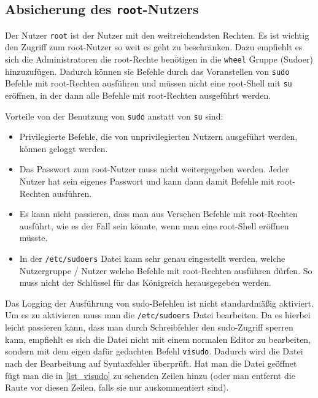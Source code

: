 \subsection{Absicherung des \texttt{root}-Nutzers}
Der Nutzer \texttt{root} ist der Nutzer mit den weitreichendsten Rechten. Es ist wichtig den Zugriff zum root-Nutzer so weit es geht zu beschränken. Dazu empfiehlt es sich die Administratoren die root-Rechte benötigen in die \texttt{wheel} Gruppe {\small(Sudoer)} hinzuzufügen. Dadurch können sie Befehle durch das Voranstellen von \texttt{sudo} Befehle mit root-Rechten ausführen und müssen nicht eine root-Shell mit \texttt{su} eröffnen, in der dann alle Befehle mit root-Rechten ausgeführt werden.\cite{GuideSecureConfiguration2011, SecurityArchWiki}

Vorteile von der Benutzung von \texttt{sudo} anstatt von \texttt{su} sind\cite{SecurityArchWiki}:
\begin{itemize}
  \item Privilegierte Befehle, die von unprivilegierten Nutzern ausgeführt werden, können geloggt werden.
  \item Das Passwort zum root-Nutzer muss nicht weitergegeben werden. Jeder Nutzer hat sein eigenes Passwort und kann dann damit Befehle mit root-Rechten ausführen.
  \item Es kann nicht passieren, dass man aus Versehen Befehle mit root-Rechten ausführt, wie es der Fall sein könnte, wenn man eine root-Shell eröffnen müsste.
  \item In der \texttt{/etc/sudoers} Datei kann sehr genau eingestellt werden, welche Nutzergruppe / Nutzer welche Befehle mit root-Rechten ausführen dürfen. So muss nicht der Schlüssel für das Königreich herausgegeben werden.
\end{itemize}

Das Logging der Ausführung von sudo-Befehlen ist nicht standardmäßig aktiviert. Um es zu aktivieren muss man die \texttt{/etc/sudoers} Datei bearbeiten. Da es hierbei leicht passieren kann, dass man durch Schreibfehler den sudo-Zugriff sperren kann, empfiehlt es sich die Datei nicht mit einem normalen Editor zu bearbeiten, sondern mit dem eigen dafür gedachten Befehl \texttt{visudo}. Dadurch wird die Datei nach der Bearbeitung auf Syntaxfehler überprüft.\cite[S. 39]{GuideSecureConfiguration2011} Hat man die Datei geöffnet fügt man die in \autoref{lst_visudo} zu sehenden Zeilen hinzu {\small(oder man entfernt die Raute vor diesen Zeilen, falls sie nur auskommentiert sind)}.\cite{SudoLogging2019,SudoersManual}

